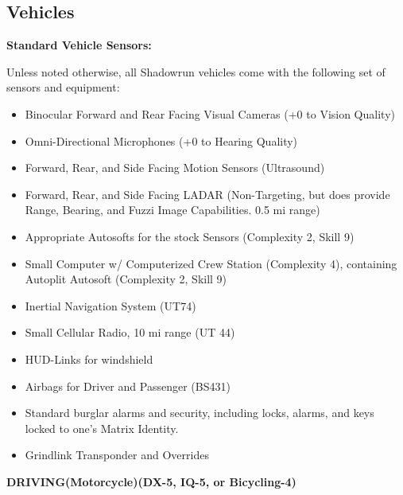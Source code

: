 \subsection{Vehicles}

\textbf{Standard Vehicle Sensors:}

Unless noted otherwise, all Shadowrun vehicles come with the following set of sensors and equipment:

\begin{itemize}
	\itemsep 0pt
	\item Binocular Forward and Rear Facing Visual Cameras (+0 to Vision Quality)
	\item Omni-Directional Microphones (+0 to Hearing Quality)
	\item Forward, Rear, and Side Facing Motion Sensors (Ultrasound)
	\item Forward, Rear, and Side Facing LADAR (Non-Targeting, but does provide Range, Bearing, and Fuzzi Image Capabilities. 0.5 mi range)
	\item Appropriate Autosofts for the stock Sensors (Complexity 2, Skill 9)
	\item Small Computer w/ Computerized Crew Station (Complexity 4), containing Autoplit Autosoft (Complexity 2, Skill 9)
	\item Inertial Navigation System (UT74) 
	\item Small Cellular Radio, 10 mi range (UT 44)
	\item HUD-Links for windshield
	\item Airbags for Driver and Passenger (BS431)
	\item Standard burglar alarms and security, including locks, alarms, and keys locked to one's Matrix Identity.
	\item Grindlink Transponder and Overrides
\end{itemize}

\textbf{DRIVING(Motorcycle)(DX-5, IQ-5, or Bicycling-4)}
\begin{center} 
	\begin{adjustwidth}{-9.5mm}{}
	\end{adjustwidth}
\end{center}


